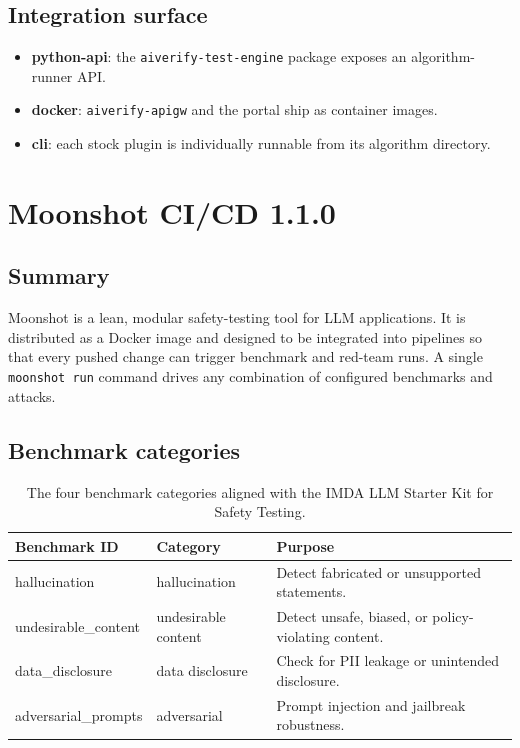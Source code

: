 \subsection*{Integration surface}

\begin{itemize}
  \item \textbf{python-api}: the \texttt{aiverify-test-engine} package
        exposes an algorithm-runner API.
  \item \textbf{docker}: \texttt{aiverify-apigw} and the portal ship as
        container images.
  \item \textbf{cli}: each stock plugin is individually runnable from
        its algorithm directory.
\end{itemize}

\section{Moonshot CI/CD 1.1.0}

\subsection*{Summary}

Moonshot is a lean, modular safety-testing tool for LLM applications. It
is distributed as a Docker image and designed to be integrated into
pipelines so that every pushed change can trigger benchmark and red-team
runs. A single \texttt{moonshot run} command drives any combination of
configured benchmarks and attacks.

\subsection*{Benchmark categories}

\begin{table}[h]
\centering
\small
\begin{tabularx}{\textwidth}{p{3.2cm}p{3.6cm}X}
\toprule
\textbf{Benchmark ID} & \textbf{Category} & \textbf{Purpose} \\
\midrule
hallucination & hallucination & Detect fabricated or unsupported statements. \\
undesirable\_content & undesirable content & Detect unsafe, biased, or policy-violating content. \\
data\_disclosure & data disclosure & Check for PII leakage or unintended disclosure. \\
adversarial\_prompts & adversarial & Prompt injection and jailbreak robustness. \\
\bottomrule
\end{tabularx}
\caption{The four benchmark categories aligned with the IMDA LLM Starter
Kit for Safety Testing.}
\label{tab:ms-benchmarks}
\end{table}

